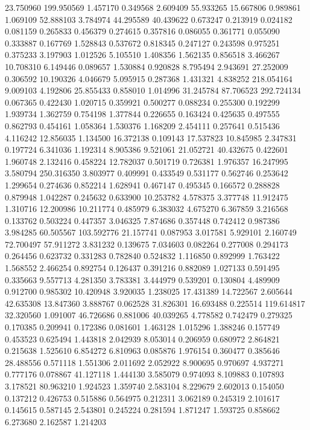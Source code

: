 23.750960
199.950569
1.457170
0.349568
2.609409
55.933265
15.667806
0.989861
1.069109
52.888103
3.784974
44.295589
40.439622
0.673247
0.213919
0.024182
0.081159
0.265833
0.456379
0.274615
0.357816
0.086055
0.361771
0.055090
0.333887
0.167769
1.528843
0.537672
0.818345
0.247127
0.243598
0.975251
0.375233
3.197903
1.012526
5.105510
1.408356
1.562135
0.856518
3.466267
10.708310
6.149446
0.089657
1.530884
0.920828
8.795494
2.943691
27.252009
0.306592
10.190326
4.046679
5.095915
0.287368
1.431321
4.838252
218.054164
9.009103
4.192806
25.855433
0.858010
1.014996
31.245784
87.706523
292.724134
0.067365
0.422430
1.020715
0.359921
0.500277
0.088234
0.255300
0.192299
1.939734
1.362759
0.754198
1.377844
0.226655
0.163424
0.425635
0.497555
0.862793
0.454161
1.058364
1.530376
1.168209
2.454111
0.257641
0.515436
4.116242
12.856035
1.134500
16.372138
0.109143
17.537823
10.845985
2.347831
0.197724
6.341036
1.192314
8.905386
9.521061
21.052721
40.432675
0.422601
1.960748
2.132416
0.458224
12.782037
0.501719
0.726381
1.976357
16.247995
3.580794
250.316350
3.803977
0.409991
0.433549
0.531177
0.562746
0.253642
1.299654
0.274636
0.852214
1.628941
0.467147
0.495345
0.166572
0.288828
0.879948
1.042287
0.245632
0.633900
10.253782
4.578375
3.377748
11.912475
1.310716
12.200986
10.211774
0.485979
6.383032
4.675270
6.367859
3.216568
0.133762
0.503224
0.447357
3.046325
7.874686
0.357448
0.742412
0.987386
3.984285
60.505567
103.592776
21.157741
0.087953
3.017581
5.929101
2.160749
72.700497
57.911272
3.831232
0.139675
7.034603
0.082264
0.277008
0.294173
0.264456
0.623732
0.331283
0.782840
0.524832
1.116850
0.892999
1.763422
1.568552
2.466254
0.892754
0.126437
0.391216
0.882089
1.027133
0.591495
0.335663
9.557713
4.281350
3.783381
3.444979
0.539201
0.130804
4.489909
0.912700
0.985302
10.420948
3.920035
1.238025
17.431389
14.722567
2.605644
42.635308
13.847360
3.888767
0.062528
31.826301
16.693488
0.225514
119.614817
32.320560
1.091007
46.726686
0.881006
40.039265
4.778582
0.742479
0.279325
0.170385
0.209941
0.172386
0.081601
1.463128
1.015296
1.388246
0.157749
0.453523
0.625494
1.443818
2.042939
8.053014
0.206959
0.680972
2.864821
0.215638
1.525610
6.854272
6.810963
0.085876
1.976154
0.360477
0.385646
28.488556
0.571118
1.551306
2.011692
2.052922
8.900695
0.970697
4.937271
0.777176
0.078867
41.127118
1.444130
3.585079
0.974093
8.109883
0.107893
3.178521
80.963210
1.924523
1.359740
2.583104
8.229679
2.602013
0.154050
0.137212
0.426753
0.515886
0.564975
0.212311
3.062189
0.245319
2.101617
0.145615
0.587145
2.543801
0.245224
0.281594
1.871247
1.593725
0.858662
6.273680
2.162587
1.214203
